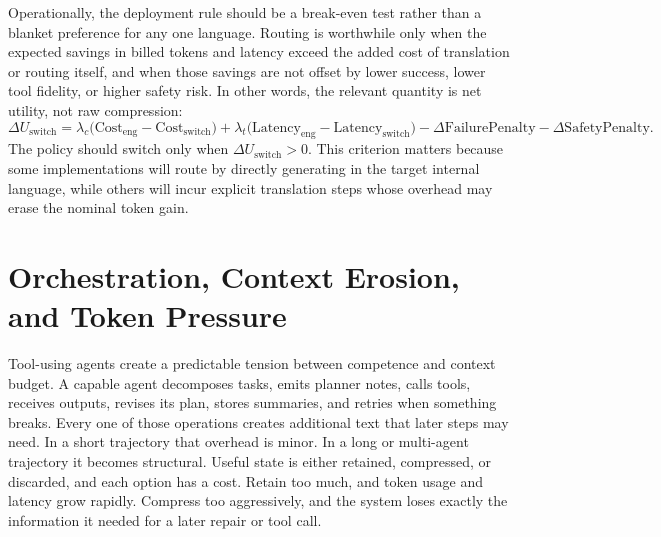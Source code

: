 \documentclass[11pt]{article}
\begin{document}
Operationally, the deployment rule should be a break-even test rather than a blanket preference for any one language. Routing is worthwhile only when the expected savings in billed tokens and latency exceed the added cost of translation or routing itself, and when those savings are not offset by lower success, lower tool fidelity, or higher safety risk. In other words, the relevant quantity is net utility, not raw compression:
\[
\Delta U_{\mathrm{switch}} =
\lambda_c \bigl(\mathrm{Cost}_{\mathrm{eng}} - \mathrm{Cost}_{\mathrm{switch}}\bigr) +
\lambda_t \bigl(\mathrm{Latency}_{\mathrm{eng}} - \mathrm{Latency}_{\mathrm{switch}}\bigr) -
\Delta \mathrm{FailurePenalty} -
\Delta \mathrm{SafetyPenalty}.
\]
The policy should switch only when $\Delta U_{\mathrm{switch}} > 0$. This criterion matters because some implementations will route by directly generating in the target internal language, while others will incur explicit translation steps whose overhead may erase the nominal token gain.

\section{Orchestration, Context Erosion, and Token Pressure}

Tool-using agents create a predictable tension between competence and context budget. A capable agent decomposes tasks, emits planner notes, calls tools, receives outputs, revises its plan, stores summaries, and retries when something breaks. Every one of those operations creates additional text that later steps may need. In a short trajectory that overhead is minor. In a long or multi-agent trajectory it becomes structural. Useful state is either retained, compressed, or discarded, and each option has a cost. Retain too much, and token usage and latency grow rapidly. Compress too aggressively, and the system loses exactly the information it needed for a later repair or tool call.
\end{document}
